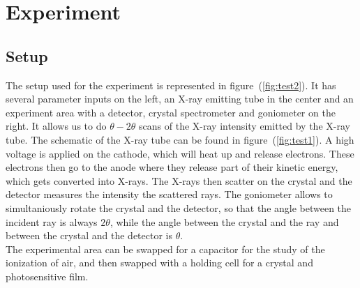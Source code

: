 \documentclass{scrartcl}
\begin{document}
\section{Experiment}

\subsection{Setup}

\noindent The setup used for the experiment is represented in figure~(\ref{fig:test2}). It has several parameter inputs on the left, an X-ray emitting tube in the center and an experiment area with a detector, crystal spectrometer and goniometer on the right. It allows us to do $\theta-2\theta$ scans of the X-ray intensity emitted by the X-ray tube. The schematic of the X-ray tube can be found in figure~(\ref{fig:test1}). A high voltage is applied on the cathode, which will heat up and release electrons. These electrons then go to the anode where they release part of their kinetic energy, which gets converted into X-rays. The X-rays then scatter on the crystal and the detector measures the intensity the scattered rays. The goniometer allows to simultaniously rotate the crystal and the detector, so that the angle between the incident ray is always $2\theta$, while the angle between the crystal and the ray and between the crystal and the detector is $\theta$. \\ The experimental area can be swapped for a capacitor for the study of the ionization of air, and then swapped with a holding cell for a crystal and photosensitive film.
\end{document}
